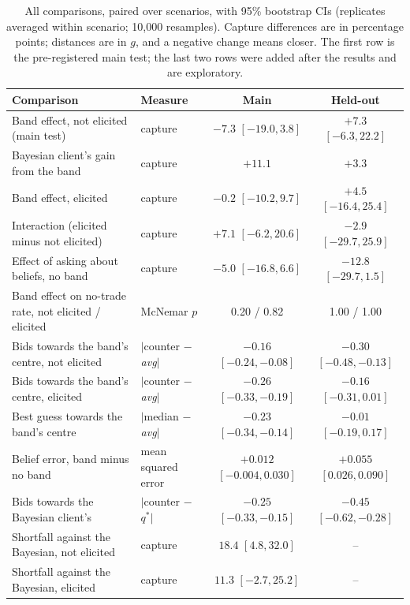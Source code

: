 \documentclass[sigconf]{acmart}
\begin{document}
\begin{table}[t]
  \small
  \caption{All comparisons, paired over scenarios, with 95\% bootstrap CIs (replicates averaged within scenario; 10,000 resamples). Capture differences are in percentage points; distances are in $g$, and a negative change means closer. The first row is the pre-registered main test; the last two rows were added after the results and are exploratory.}
  \label{tab:tests}
  \begin{tabular}{@{}llcc@{}}
    \toprule
    Comparison & Measure & Main & Held-out \\
    \midrule
    Band effect, not elicited (main test) & capture & $-7.3$ $[-19.0, 3.8]$ & $+7.3$ $[-6.3, 22.2]$ \\
    Bayesian client's gain from the band & capture & $+11.1$ & $+3.3$ \\
    Band effect, elicited & capture & $-0.2$ $[-10.2, 9.7]$ & $+4.5$ $[-16.4, 25.4]$ \\
    Interaction (elicited minus not elicited) & capture & $+7.1$ $[-6.2, 20.6]$ & $-2.9$ $[-29.7, 25.9]$ \\
    Effect of asking about beliefs, no band & capture & $-5.0$ $[-16.8, 6.6]$ & $-12.8$ $[-29.7, 1.5]$ \\
    Band effect on no-trade rate, not elicited / elicited & McNemar $p$ & 0.20 / 0.82 & 1.00 / 1.00 \\
    Bids towards the band's centre, not elicited & $|$counter $-$ \textit{avg}$|$ & $-0.16$ $[-0.24, -0.08]$ & $-0.30$ $[-0.48, -0.13]$ \\
    Bids towards the band's centre, elicited & $|$counter $-$ \textit{avg}$|$ & $-0.26$ $[-0.33, -0.19]$ & $-0.16$ $[-0.31, 0.01]$ \\
    Best guess towards the band's centre & $|$median $-$ \textit{avg}$|$ & $-0.23$ $[-0.34, -0.14]$ & $-0.01$ $[-0.19, 0.17]$ \\
    Belief error, band minus no band & mean squared error & $+0.012$ $[-0.004, 0.030]$ & $+0.055$ $[0.026, 0.090]$ \\
    Bids towards the Bayesian client's & $|$counter $-$ $q^*|$ & $-0.25$ $[-0.33, -0.15]$ & $-0.45$ $[-0.62, -0.28]$ \\
    \midrule
    Shortfall against the Bayesian, not elicited & capture & $18.4$ $[4.8, 32.0]$ & -- \\
    Shortfall against the Bayesian, elicited & capture & $11.3$ $[-2.7, 25.2]$ & -- \\
    \bottomrule
  \end{tabular}
\end{table}
\end{document}
